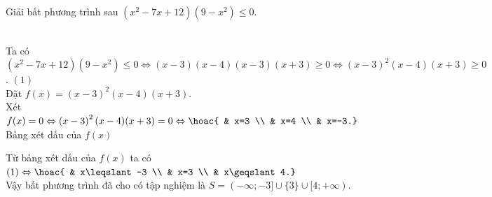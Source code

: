 \begin{bt}%
Giải bất phương trình sau $\left(x^2-7x+12\right)\left(9-x^2\right)\leqslant0$.
\loigiai
{\\
Ta có $\left(x^2-7x+12\right)\left(9-x^2\right)\leqslant0 \Leftrightarrow (x-3)(x-4)(x-3)(x+3)\geqslant0 \Leftrightarrow \left(x-3\right)^2(x-4)(x+3)\geqslant0$. \hfill $(1)$ \\
Đặt $f(x)=\left(x-3\right)^2(x-4)(x+3)$. \\
Xét $f(x)=0 \Leftrightarrow \left(x-3\right)^2(x-4)(x+3)=0 \Leftrightarrow \hoac{ & x=3 \\ & x=4 \\ & x=-3.}$ \\
Bảng xét dấu của $f(x)$
\begin{center}
\end{center}
Từ bảng xét dấu của $f(x)$ ta có $(1) \Leftrightarrow \hoac{ & x\leqslant-3 \\ & x=3 \\ & x\geqslant4.}$ \\
Vậy bất phương trình đã cho có tập nghiệm là $S=(-\infty;-3]\cup\{3\}\cup[4;+\infty)$.
}
\end{bt}

